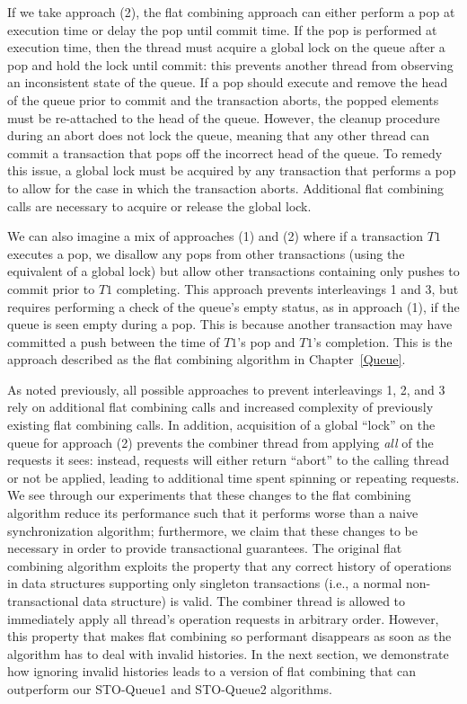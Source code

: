 If we take approach (2), the flat combining approach can either perform a pop at execution time or delay the pop until commit time. If the pop is performed at execution time, then the thread must acquire a global lock on the queue after a pop and hold the lock until commit: this prevents another thread from observing an inconsistent state of the queue. If a pop should execute and remove the head of the queue prior to commit and the transaction aborts, the popped elements must be re-attached to the head of the queue. However, the cleanup procedure during an abort does not lock the queue, meaning that any other thread can commit a transaction that pops off the incorrect head of the queue. To remedy this issue, a global lock must be acquired by any transaction that performs a pop to allow for the case in which the transaction aborts. Additional flat combining calls are necessary to acquire or release the global lock. 

We can also imagine a mix of approaches (1) and (2) where if a transaction $T1$ executes a pop, we disallow any pops from other transactions (using the equivalent of a global lock) but allow other transactions containing only pushes to commit prior to $T1$ completing. This approach prevents interleavings 1 and 3, but requires performing a check of the queue's empty status, as in approach (1), if the queue is seen empty during a pop. This is because another transaction may have committed a push between the time of $T1$'s pop and $T1$'s completion. This is the approach described as the flat combining algorithm in Chapter~\ref{Queue}.

As noted previously, all possible approaches to prevent interleavings 1, 2, and 3 rely on additional flat combining calls and increased complexity of previously existing flat combining calls. In addition, acquisition of a global ``lock'' on the queue for approach (2) prevents the combiner thread from applying \emph{all} of the requests it sees: instead, requests will either return ``abort'' to the calling thread or not be applied, leading to additional time spent spinning or repeating requests. We see through our experiments that these changes to the flat combining algorithm reduce its performance such that it performs worse than a naive synchronization algorithm; furthermore, we claim that these changes to be necessary in order to provide transactional guarantees. The original flat combining algorithm exploits the property that any correct history of operations in data structures supporting only singleton transactions (i.e., a normal non-transactional data structure) is valid. The combiner thread is allowed to immediately apply all thread's operation requests in arbitrary order. However, this property that makes flat combining so performant disappears as soon as the algorithm has to deal with invalid histories. In the next section, we demonstrate how ignoring invalid histories leads to a version of flat combining that can outperform our STO-Queue1 and STO-Queue2 algorithms.


